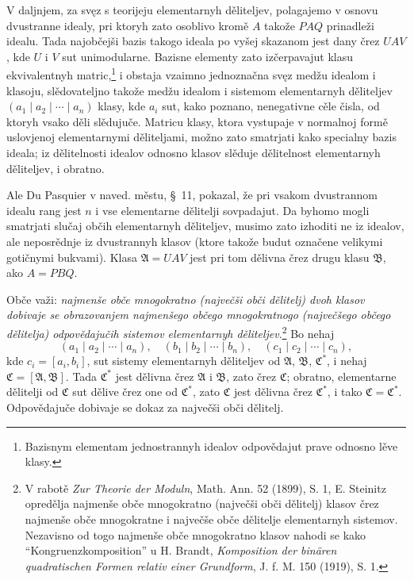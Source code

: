 \documentclass[11pt]{article}
\begin{document}
V daljnjem, za svęz s teorijeju elementarnyh děliteljev, polagajemo v osnovu dvustranne idealy, pri ktoryh zato osoblivo kromě \(A\) takože \(PAQ\) prinadleži idealu. Tada najobčejši bazis takogo ideala po vyšej skazanom jest dany črez \(UAV\), kde \(U\) i \(V\) sut unimodularne. Bazisne elementy zato izčerpavajut klasu ekvivalentnyh matric,\footnote{Bazisnym elementam jednostrannyh idealov odpovědajut prave odnosno lěve klasy.} i obstaja vzaimno jednoznačna svęz medžu idealom i klasoju, slědovateljno takože medžu idealom i sistemom elementarnyh děliteljev \((a_1\mid a_2\mid\cdots\mid a_n)\) klasy, kde \(a_i\) sut, kako poznano, nenegativne cěle čisla, od ktoryh vsako děli slědujuče. Matricu klasy, ktora vystupaje v normalnoj formě uslovjenoj elementarnymi děliteljami, možno zato smatrjati kako specialny bazis ideala; iz dělitelnosti idealov odnosno klasov slěduje dělitelnost elementarnyh děliteljev, i obratno.

Ale Du Pasquier v naved. městu, \S~11, pokazal, že pri vsakom dvustrannom idealu rang jest \(n\) i vse elementarne dělitelji sovpadajut. Da byhomo mogli smatrjati slučaj občih elementarnyh děliteljev, musimo zato izhoditi ne iz idealov, ale neposrědnje iz dvustrannyh klasov (ktore takože budut označene velikymi gotičnymi bukvami). Klasa \(\mathfrak A=UAV\) jest pri tom dělivna črez drugu klasu \(\mathfrak B\), ako \(A=PBQ\).

Obče važi: \emph{najmenše obče mnogokratno (največši obči dělitelj) dvoh klasov dobivaje se obrazovanjem najmenšego občego mnogokratnogo (največšego občego dělitelja) odpovědajučih sistemov elementarnyh děliteljev}.\footnote{V rabotě \emph{Zur Theorie der Moduln}, Math. Ann. 52 (1899), S. 1, E. Steinitz opredělja najmenše obče mnogokratno (največši obči dělitelj) klasov črez najmenše obče mnogokratne i največše obče dělitelje elementarnyh sistemov. Nezavisno od togo najmenše obče mnogokratno klasov nahodi se kako ``Kongruenzkomposition'' u H. Brandt, \emph{Komposition der binären quadratischen Formen relativ einer Grundform}, J. f. M. 150 (1919), S. 1.} Bo nehaj
\[
 (a_1\mid a_2\mid\cdots\mid a_n),\quad
 (b_1\mid b_2\mid\cdots\mid b_n),\quad
 (c_1\mid c_2\mid\cdots\mid c_n),
\]
kde \(c_i=[a_i,b_i]\), sut sistemy elementarnyh děliteljev od \(\mathfrak A\), \(\mathfrak B\), \(\mathfrak C^*\), i nehaj \(\mathfrak C=[\mathfrak A,\mathfrak B]\). Tada \(\mathfrak C^*\) jest dělivna črez \(\mathfrak A\) i \(\mathfrak B\), zato črez \(\mathfrak C\); obratno, elementarne dělitelji od \(\mathfrak C\) sut dělive črez one od \(\mathfrak C^*\), zato \(\mathfrak C\) jest dělivna črez \(\mathfrak C^*\), i tako \(\mathfrak C=\mathfrak C^*\). Odpovědajuče dobivaje se dokaz za največši obči dělitelj.
\end{document}
